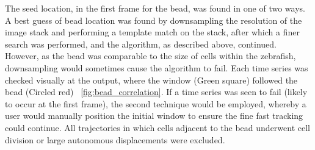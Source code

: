 
The seed location, in the first frame for the bead, was found in one of two ways.
A best guess of bead location was found by downsampling the resolution of the image stack and performing a template match on the stack, after which a finer search was performed, and the algorithm, as described above, continued.
However, as the bead was comparable to the size of cells within the zebrafish, downsampling would sometimes cause the algorithm to fail.
Each time series was checked visually at the output, where the window (Green square) followed the bead (Circled red) \figurename~\ref{fig:bead_correlation}.
If a time series was seen to fail (likely to occur at the first frame), the second technique would be employed, whereby a user would manually position the initial window to ensure the fine fast tracking could continue.
All trajectories in which cells adjacent to the bead underwent cell division or large autonomous displacements were excluded.


